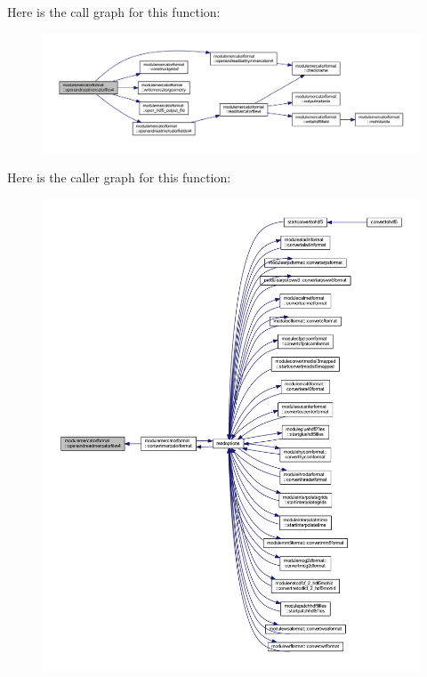 Here is the call graph for this function\+:\nopagebreak
\begin{figure}[H]
\begin{center}
\leavevmode
\includegraphics[width=350pt]{namespacemodulemercatorformat_a784b726c2a75725a56db4e874c93724a_cgraph}
\end{center}
\end{figure}
Here is the caller graph for this function\+:\nopagebreak
\begin{figure}[H]
\begin{center}
\leavevmode
\includegraphics[width=350pt]{namespacemodulemercatorformat_a784b726c2a75725a56db4e874c93724a_icgraph}
\end{center}
\end{figure}
\mbox{\label{namespacemodulemercatorformat_a693845c08b34a8acfedbf088b2a06787}} 
